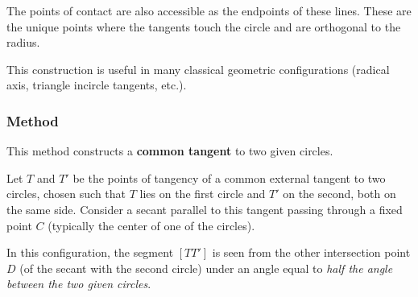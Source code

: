 \medskip
\noindent
The points of contact are also accessible as the endpoints of these lines. These are the unique points where the tangents touch the circle and are orthogonal to the radius.

\medskip
\noindent
This construction is useful in many classical geometric configurations (radical axis, triangle incircle tangents, etc.).

\vspace{1em}


\begin{minipage}{.5\textwidth}
\begin{center}
\end{center}

\end{minipage}
\begin{minipage}{.5\textwidth}
\begin{tkzexample}
\end{tkzexample}
\end{minipage}

\subsubsection{Method }
\label{ssub:common_tangent}

This method constructs a \textbf{common tangent} to two given circles.

\medskip
\noindent
Let $T$ and $T'$ be the points of tangency of a common external tangent to two circles, chosen such that $T$ lies on the first circle and $T'$ on the second, both on the same side. Consider a secant parallel to this tangent passing through a fixed point $C$ (typically the center of one of the circles).

\medskip
\noindent
In this configuration, the segment $[TT']$ is seen from the other intersection point $D$ (of the secant with the second circle) under an angle equal to \emph{half the angle between the two given circles}.

